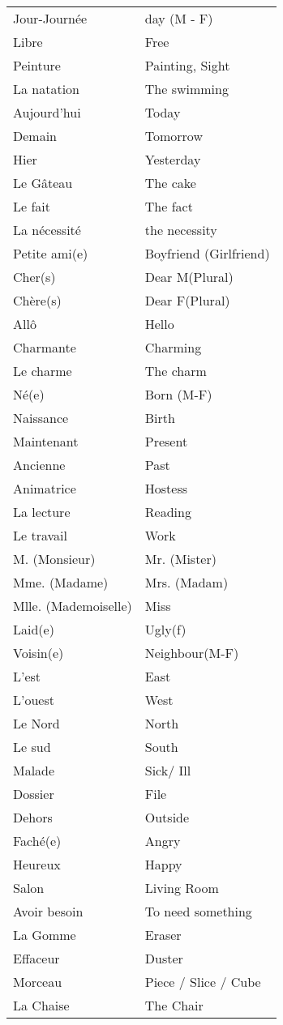 \begin{longtable}{l  l}
Jour-Journ\'ee & day (M - F) \\
Libre & Free \\
Peinture & Painting, Sight \\
La natation & The swimming \\
Aujourd'hui & Today \\
Demain & Tomorrow \\
Hier & Yesterday \\
Le G\^ateau & The cake \\
Le fait & The fact \\
La n\'ecessit\'e & the necessity \\
Petite ami(e) & Boyfriend (Girlfriend) \\
Cher(s) & Dear M(Plural) \\
Ch\`ere(s) & Dear F(Plural) \\
All\^o & Hello \\
Charmante & Charming \\
Le charme & The charm \\
N\'e(e) & Born (M-F) \\
Naissance & Birth \\
Maintenant & Present \\
Ancienne & Past \\
Animatrice & Hostess \\
La lecture & Reading \\
Le travail & Work \\
M. (Monsieur) & Mr. (Mister) \\
Mme. (Madame) & Mrs. (Madam) \\
Mlle. (Mademoiselle) & Miss \\
Laid(e) & Ugly(f) \\
Voisin(e) & Neighbour(M-F)\\
L'est & East \\
L'ouest & West \\
Le Nord & North \\
Le sud & South \\
Malade & Sick/ Ill \\
Dossier & File \\
Dehors & Outside \\
Fach\'e(e) & Angry \\
Heureux & Happy\\
Salon & Living Room \\
Avoir besoin & To need something\\
La Gomme & Eraser \\
Effaceur & Duster\\
Morceau & Piece / Slice / Cube \\
La Chaise & The Chair \\
\end{longtable}
